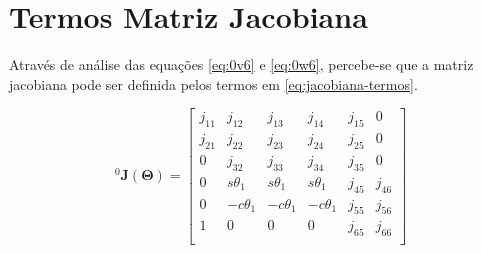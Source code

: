 
\section{Termos Matriz Jacobiana}
\label{AnexoJacobiana-SecTermos}

Através de análise das equações \ref{eq:0v6} e \ref{eq:0w6}, percebe-se que a matriz jacobiana pode ser definida 
pelos termos em \ref{eq:jacobiana-termos}.

\begin{equation}
    \label{eq:jacobiana-termos}
    ^0\textbf{J}(\boldsymbol{\Theta}) = 
    \begin{bmatrix}
        j_{11} & j_{12} & j_{13} & j_{14} & j_{15} & 0 \\
        j_{21} & j_{22} & j_{23} & j_{24} & j_{25} & 0 \\
        0 & j_{32} & j_{33} & j_{34} & j_{35} & 0 \\
        0 &  s\theta_1 &  s\theta_1 &  s\theta_1 & j_{45} & j_{46} \\
        0 & -c\theta_1 & -c\theta_1 & -c\theta_1 & j_{55} & j_{56} \\
        1 &   0  &   0  &   0  & j_{65} & j_{66} \\    
    \end{bmatrix}
\end{equation}

